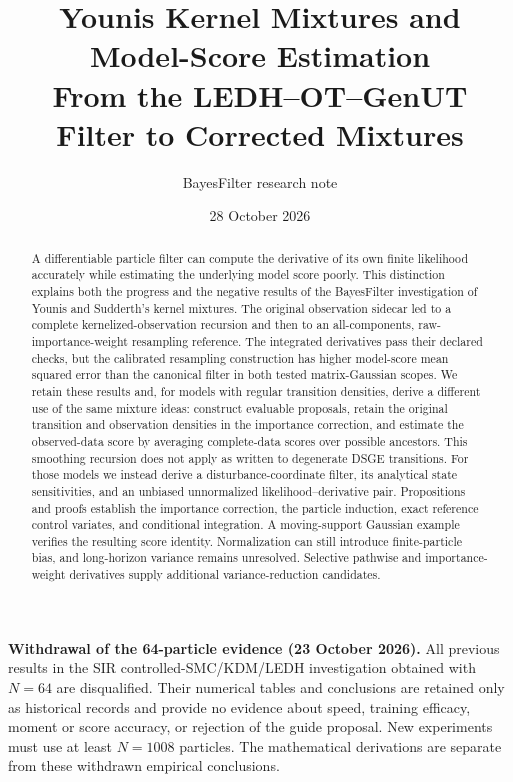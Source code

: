 \documentclass[11pt]{article}
\title{Younis Kernel Mixtures and Model-Score Estimation\\
From the LEDH--OT--GenUT Filter to Corrected Mixtures}
\author{BayesFilter research note}
\date{28 October 2026}
\begin{document}
\maketitle

\noindent\textbf{Withdrawal of the 64-particle evidence (23 October 2026).}
All previous results in the SIR controlled-SMC/KDM/LEDH investigation obtained
with $N=64$ are disqualified. Their numerical tables and conclusions are retained
only as historical records and provide no evidence about speed, training efficacy,
moment or score accuracy, or rejection of the guide proposal. New experiments
must use at least $N=1008$ particles. The mathematical derivations are separate
from these withdrawn empirical conclusions.

\begin{abstract}
A differentiable particle filter can compute the derivative of its own
finite likelihood accurately while estimating the underlying model score
poorly. This distinction explains both the progress and the negative results
of the BayesFilter investigation of Younis and Sudderth's kernel mixtures.
The original observation sidecar led to a complete kernelized-observation
recursion and then to an all-components, raw-importance-weight resampling
reference. The integrated derivatives pass their declared checks, but the
calibrated resampling construction has higher model-score mean squared error
than the canonical filter in both tested matrix-Gaussian scopes. We retain
these results and, for models with regular transition densities, derive a
different use of the same mixture ideas: construct evaluable proposals,
retain the original transition and observation densities in the importance
correction, and estimate the observed-data score by averaging complete-data
scores over possible ancestors. This smoothing recursion does not apply as
written to degenerate DSGE transitions. For those models we instead derive
a disturbance-coordinate filter, its analytical state sensitivities, and an
unbiased unnormalized likelihood--derivative pair. Propositions and proofs
establish the importance correction, the particle induction, exact reference
control variates, and conditional integration. A moving-support Gaussian
example verifies the resulting score identity. Normalization can still
introduce finite-particle bias, and long-horizon variance remains unresolved.
Selective pathwise and importance-weight derivatives supply additional
variance-reduction candidates.


\end{abstract}
\end{document}

